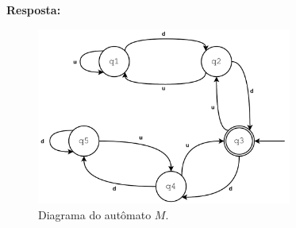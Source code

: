 \documentclass[a4paper, 12pt]{article}
\begin{document}
\textbf{Resposta:}

\begin{figure}[ht]
    \includegraphics[width=8.4cm]{./imgs/lfa-trab-1.pdf}
    \centering
    \caption{Diagrama do autômato $M$.}
    \label{fig:diag_m}
\end{figure}
\end{document}
